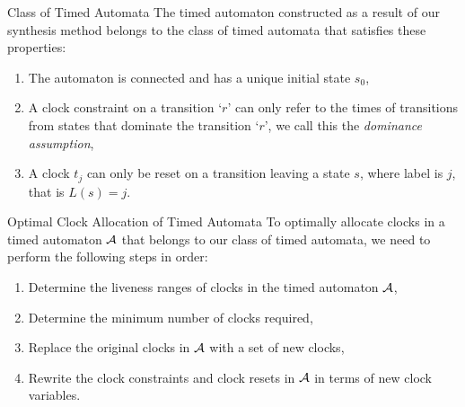 \documentclass[10pt]{beamer}
\theoremstyle{plain}
\theoremstyle{definition}
\begin{document}
\begin{frame}{Class of Timed Automata}
The timed automaton constructed as a result of our synthesis method belongs to the class of timed automata that satisfies these properties:
	\begin{enumerate}
		\item{The automaton is connected and has a unique initial state $s_0$,}%
		\item{A clock constraint on a transition `$r$' can only refer to the times of transitions from states that dominate the transition `$r$', we call this the \textit{dominance assumption}},
		\item{A clock $t_j$ can only be reset on a transition leaving a state $s$, where label is $j$, that is $L(s)=j$.}
	\end{enumerate}
\end{frame}

\begin{frame}{Optimal Clock Allocation of Timed Automata}
	To optimally allocate clocks in a timed automaton $\cal A$ that belongs to our class of timed automata, we need to perform the following steps in order:
	\begin{enumerate}
		\item{Determine the liveness ranges of clocks in the timed automaton $\cal A$,}
		\item{Determine the minimum number of clocks required,}
		\item{Replace the original clocks in $\cal A$ with a set of new clocks,} %
		\item{Rewrite the clock constraints and clock resets in $\cal A$ in terms of new clock variables.}
	\end{enumerate}

\end{frame}
\end{document}
